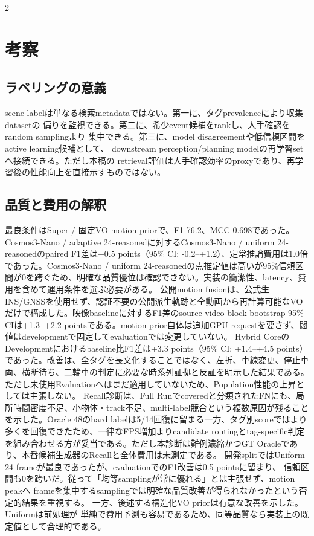 \documentclass[9pt,a4paper]{extarticle}
\begin{document}
\begin{multicols}{2}
\section{考察}
\subsection{ラベリングの意義}
scene labelは単なる検索metadataではない。第一に、タグprevalenceにより収集datasetの
偏りを監視できる。第二に、希少event候補をrankし、人手確認をrandom samplingより
集中できる。第三に、model disagreementや低信頼区間をactive learning候補として、
downstream perception/planning modelの再学習setへ接続できる。ただし本稿の
retrieval評価は人手確認効率のproxyであり、再学習後の性能向上を直接示すものではない。

\subsection{品質と費用の解釈}
最良条件はSuper / 固定VO motion priorで、F1 76.2、MCC 0.698であった。
Cosmos3-Nano / adaptive 24-reasonedに対するCosmos3-Nano / uniform 24-reasonedのpaired F1差は+0.5 points（95\% CI: -0.2--+1.2）、定常推論費用は1.0倍であった。Cosmos3-Nano / uniform 24-reasonedの点推定値は高いが95\%信頼区間が0を跨ぐため、明確な品質優位は確認できない。実装の簡潔性、latency、費用を含めて運用条件を選ぶ必要がある。
公開motion fusionは、公式生INS/GNSSを使用せず、認証不要の公開派生軌跡と全動画から再計算可能なVOだけで構成した。映像baselineに対するF1差のsource-video block bootstrap 95\% CIは+1.3--+2.2 pointsである。motion prior自体は追加GPU requestを要さず、閾値はdevelopmentで固定してevaluationでは変更していない。
Hybrid CoreのDevelopmentにおけるbaseline比F1差は+3.3 points（95\% CI: +1.4--+4.5 points）であった。改善は、全タグを長文化することではなく、左折、車線変更、停止車両、横断待ち、二輪車の判定に必要な時系列証拠と反証を明示した結果である。ただし未使用Evaluationへはまだ適用していないため、Population性能の上昇としては主張しない。
Recall診断は、Full Runでcoveredと分類されたFNにも、局所時間密度不足、小物体・track不足、multi-label競合という複数原因が残ることを示した。Oracle 48のhard labelは5/14回復に留まる一方、タグ別scoreではより多くを回復できたため、一律なFPS増加よりcandidate routingとtag-specific判定を組み合わせる方が妥当である。ただし本診断は難例濃縮かつGT Oracleであり、本番候補生成器のRecallと全体費用は未測定である。
開発splitではUniform 24-frameが最良であったが、evaluationでのF1改善は0.5 pointsに留まり、
信頼区間も0を跨いだ。従って「均等samplingが常に優れる」とは主張せず、motion peakへ
frameを集中するsamplingでは明確な品質改善が得られなかったという否定的結果を重視する。
一方、後述する構造化VO priorは有意な改善を示した。Uniformは前処理が
単純で費用予測も容易であるため、同等品質なら実装上の既定値として合理的である。


\end{multicols}
\end{document}
